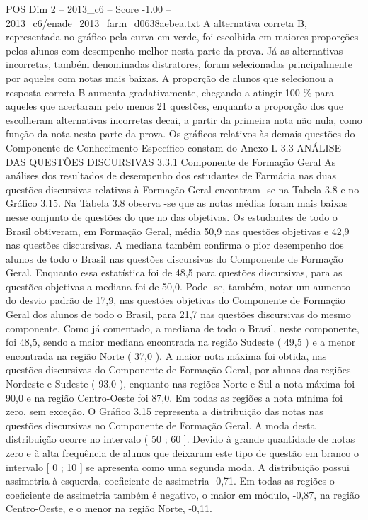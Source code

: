 \begin{textsample}{POS Dim 2 – 2013\_c6 – Score -1.00 – 2013\_c6/enade\_2013\_farm\_d0638aebea.txt}
A alternativa correta B, representada no gráfico pela curva em verde, foi escolhida em maiores proporções pelos alunos com desempenho melhor nesta parte da prova.
Já as alternativas incorretas, também denominadas distratores, foram selecionadas principalmente por aqueles com notas mais baixas.
A proporção de alunos que selecionou a resposta correta B aumenta gradativamente, chegando a atingir 100 \% para aqueles que acertaram pelo menos 21 questões, enquanto a proporção dos que escolheram alternativas incorretas decai, a partir da primeira nota não nula, como função da nota nesta parte da prova.
Os gráficos relativos às demais questões do Componente de Conhecimento Específico constam do Anexo I. 3.3 ANÁLISE DAS QUESTÕES DISCURSIVAS 3.3.1 Componente de Formação Geral As análises dos resultados de desempenho dos estudantes de Farmácia nas duas questões discursivas relativas à Formação Geral encontram -se na Tabela 3.8 e no Gráfico 3.15.
Na Tabela 3.8 observa -se que as notas médias foram mais baixas nesse conjunto de questões do que no das objetivas.
Os estudantes de todo o Brasil obtiveram, em Formação Geral, média 50,9 nas questões objetivas e 42,9 nas questões discursivas.
A mediana também confirma o pior desempenho dos alunos de todo o Brasil nas questões discursivas do Componente de Formação Geral.
Enquanto essa estatística foi de 48,5 para questões discursivas, para as questões objetivas a mediana foi de 50,0.
Pode -se, também, notar um aumento do desvio padrão de 17,9, nas questões objetivas do Componente de Formação Geral dos alunos de todo o Brasil, para 21,7 nas questões discursivas do mesmo componente.
Como já comentado, a mediana de todo o Brasil, neste componente, foi 48,5, sendo a maior mediana encontrada na região Sudeste ( 49,5 ) e a menor encontrada na região Norte ( 37,0 ).
A maior nota máxima foi obtida, nas questões discursivas do Componente de Formação Geral, por alunos das regiões Nordeste e Sudeste ( 93,0 ), enquanto nas regiões Norte e Sul a nota máxima foi 90,0 e na região Centro-Oeste foi 87,0.
Em todas as regiões a nota mínima foi zero, sem exceção.
O Gráfico 3.15 representa a distribuição das notas nas questões discursivas no Componente de Formação Geral.
A moda desta distribuição ocorre no intervalo ( 50 ; 60 ].
Devido à grande quantidade de notas zero e à alta frequência de alunos que deixaram este tipo de questão em branco o intervalo [ 0 ; 10 ] se apresenta como uma segunda moda.
A distribuição possui assimetria à esquerda, coeficiente de assimetria -0,71.
Em todas as regiões o coeficiente de assimetria também é negativo, o maior em módulo, -0,87, na região Centro-Oeste, e o menor na região Norte, -0,11.

\end{textsample}
